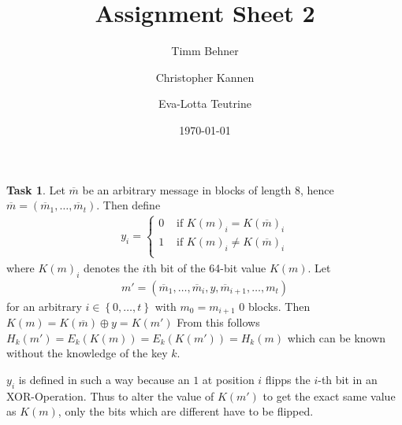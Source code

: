 \documentclass[fleqn]{scrartcl}
\title{Assignment Sheet 2}
\author{Timm Behner \and Christopher Kannen \and Eva-Lotta Teutrine}
\date{\today}
\theoremstyle{definition}
\newtheorem{exercise}{Task}
\begin{document}
\maketitle
\setcounter{exercise}{2}
\begin{exercise}
    Let $\overline m$ be an arbitrary message in blocks of length 8, hence
    $\overline m = \left( \overline m_1, \dots , \overline m_t \right)$. Then define
    \begin{align}
        y_i = \begin{cases}
            0 & \text{ if } K(m)_i = K(\overline m)_i \\
            1 & \text{ if } K(m)_i \neq K(\overline m)_i \\
        \end{cases}
    \end{align}
    where $K(m)_i$ denotes the $i$th bit of the 64-bit value $K(m)$. Let 
    \begin{align*}
        m' = \left( \overline m_1, \dots , \overline m_i, y , \overline m_{i+1}, \dots , m_t\right)
    \end{align*} 
    for an arbitrary $i \in \left\{ 0, \dots , t \right\}$ with $m_0 =
    m_{i+1}$ 0 blocks.
    Then $K(m) = K(\overline m) \oplus y = K(m')$ 
    From this follows $H_k(m') = E_k(K(m)) = E_k(K(m')) = H_k(m)$ which can be
    known without the knowledge of the key $k$.

    $y_i$ is defined in such a way because an $1$ at position $i$ flipps the
    $i$-th bit in an XOR-Operation. Thus to alter the value of $K(m')$ to get
    the exact same value as $K(m)$, only the bits which are different have to be
    flipped.
\end{exercise}
\end{document}
